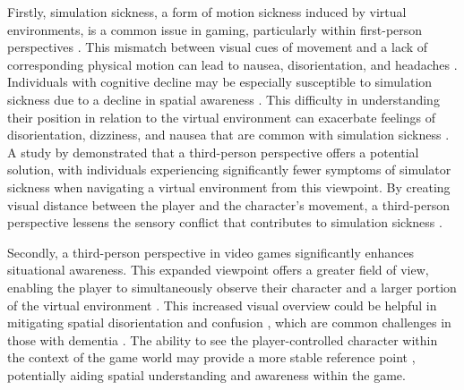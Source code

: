 \documentclass{l4proj}
\begin{document}
Firstly, simulation sickness, a form of motion sickness induced by virtual environments, is a common issue in gaming, particularly within first-person perspectives \citep{hancock_human_2008}. This mismatch between visual cues of movement and a lack of corresponding physical motion can lead to nausea, disorientation, and headaches \citep{hancock_human_2008}. Individuals with cognitive decline may be especially susceptible to simulation sickness due to a decline in spatial awareness \cite{li_china_2024}. This difficulty in understanding their position in relation to the virtual environment can exacerbate feelings of disorientation, dizziness, and nausea that are common with simulation sickness \citep{lin_effects_2002}. A study by \cite{lin_effects_2002} demonstrated that a third-person perspective offers a potential solution, with individuals experiencing significantly fewer symptoms of simulator sickness when navigating a virtual environment from this viewpoint. By creating visual distance between the player and the character's movement, a third-person perspective lessens the sensory conflict that contributes to simulation sickness \citep{lin_effects_2002}.

Secondly, a third-person perspective in video games significantly enhances situational awareness. This expanded viewpoint offers a greater field of view, enabling the player to simultaneously observe their character and a larger portion of the virtual environment \citep{denisova_first_2015}. This increased visual overview could be helpful in mitigating spatial disorientation and confusion \citep{denisova_first_2015}, which are common challenges in those with dementia \cite{li_china_2024}. The ability to see the player-controlled character within the context of the game world may provide a more stable reference point \citep{denisova_first_2015}, potentially aiding spatial understanding and awareness within the game.


\end{document}
